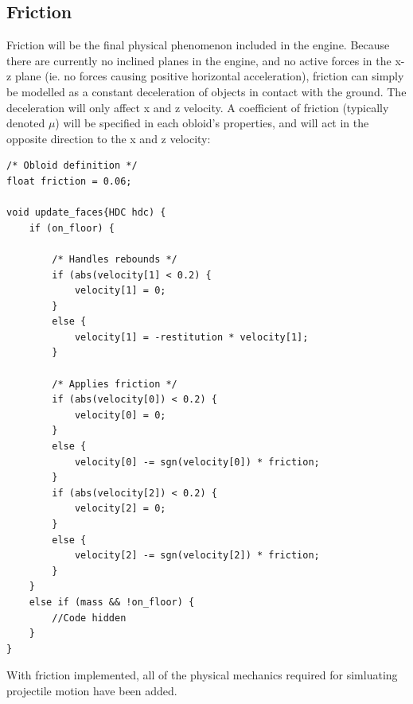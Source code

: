 \documentclass{article}
\begin{document}
\subsection{Friction}
Friction will be the final physical phenomenon included in the engine. Because there are currently no inclined planes in the engine, and no active forces in the x-z plane (ie. no forces causing positive horizontal acceleration), friction can simply be modelled as a constant deceleration of objects in contact with the ground. The deceleration will only affect x and z velocity.
\newline
\newline
A coefficient of friction (typically denoted $\mu$) will be specified in each obloid's properties, and will act in the opposite direction to the x and z velocity:
\begin{lstlisting}
/* Obloid definition */
float friction = 0.06;

void update_faces{HDC hdc) {
	if (on_floor) {
	
		/* Handles rebounds */
		if (abs(velocity[1] < 0.2) {	
			velocity[1] = 0;
		}
		else {
			velocity[1] = -restitution * velocity[1];
		}
		
		/* Applies friction */
		if (abs(velocity[0]) < 0.2) {
			velocity[0] = 0;
		}
		else {
			velocity[0] -= sgn(velocity[0]) * friction;
		}
		if (abs(velocity[2]) < 0.2) {
			velocity[2] = 0;
		}
		else {
			velocity[2] -= sgn(velocity[2]) * friction;
		}
	}
	else if (mass && !on_floor) {
		//Code hidden
	}
}
\end{lstlisting}

With friction implemented, all of the physical mechanics required for simluating projectile motion have been added.

\newpage
\end{document}
